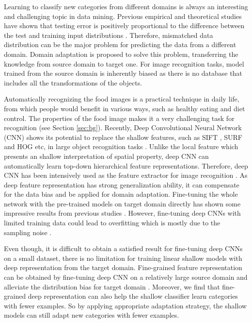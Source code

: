 ﻿Learning to classify new categories from different domains is always an interesting and challenging topic in data mining.
Previous empirical and theoretical studies have shown that testing error is positively proportional to the difference between the test and training input distributions \cite{ben2007analysis} \cite{blitzer2008learning}. Therefore, mismatched data distribution can be the major problem for predicting the data from a different domain. Domain adaptation is proposed to solve this problem, transferring the knowledge from source domain to target one. For image recognition tasks, model trained from the source domain is inherently biased as there is no database that includes all the transformations of the objects.

Automatically recognizing the food images is a practical technique in daily life, from which people would benefit in various ways, such as healthy eating and diet control. The properties of the food image makes it a very challenging task for recognition (see Section \ref{sec:bg}).
Recently, Deep Convolutional Neural Network (CNN) shows its potential to replace the shallow features, such as SIFT \cite{lowe1999object}, SURF \cite{bay2006surf} and HOG \cite{dalal2005histograms} etc, in large object recognition tasks \cite{krizhevsky2012imagenet} \cite{zeiler2014visualizing} \cite{simonyan2014very}. Unlike the local feature which presents an shallow interpretation of spatial property, deep CNN can automatically learn top-down hierarchical feature representations. Therefore, deep CNN has been intensively used as the feature extractor for image recognition \cite{farabet2013learning}. As deep feature representation has strong generalization ability, it can compensate for the data bias and be applied for domain adaptation. Fine-tuning the whole network with the pre-trained models on target domain directly has shown some impressive results from previous studies \cite{zeiler2014visualizing} \cite{Chatfield14} \cite{hoffman2013one} \cite{NIPS2014_Zhou}.
However, fine-tuning deep CNNs with limited training data could lead to overfitting which is mostly due to the sampling noise \cite{srivastava2014dropout}.

Even though, it is difficult to obtain a satisfied result for fine-tuning deep CNNs on a small dataset, there is no limitation for training linear shallow models with deep representation from the target domain. Fine-grained feature representation can be obtained by fine-tuning deep CNN on a relatively large source domain and alleviate the distribution bias for target domain \cite{zhang2014part}. Moreover, we find that fine-grained deep representation can also help the shallow classifier learn categories with fewer examples.
So by applying appropriate adaptation strategy, the shallow models can still adapt new categories with fewer examples.

